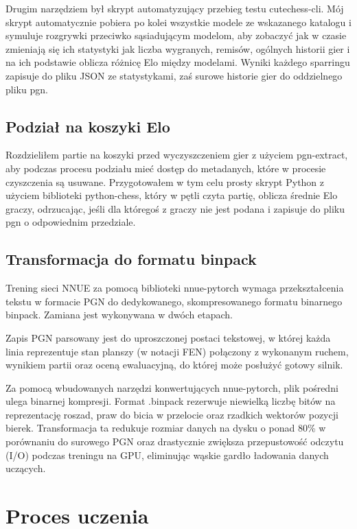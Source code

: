 \documentclass[12pt,a4paper]{report}
\begin{document}
Drugim narzędziem był skrypt automatyzujący przebieg testu cutechess-cli. Mój skrypt automatycznie pobiera po kolei wszystkie modele ze wskazanego katalogu i symuluje rozgrywki przeciwko sąsiadującym modelom, aby zobaczyć jak w czasie zmieniają się ich statystyki jak liczba wygranych, remisów, ogólnych historii gier i na ich podstawie oblicza różnicę Elo między modelami. Wyniki każdego sparringu zapisuje do pliku JSON ze statystykami, zaś surowe historie gier do oddzielnego pliku pgn.

\section{Podział na koszyki Elo}

Rozdzieliłem partie na koszyki przed wyczyszczeniem gier z użyciem pgn-extract, aby podczas procesu podziału mieć dostęp do metadanych, które w procesie czyszczenia są usuwane. Przygotowałem w tym celu prosty skrypt Python z użyciem biblioteki python-chess, który w pętli czyta partię, oblicza średnie Elo graczy, odrzucając, jeśli dla któregoś z graczy nie jest podana i zapisuje do pliku pgn o odpowiednim przedziale.

\section{Transformacja do formatu binpack}

Trening sieci NNUE za pomocą biblioteki nnue-pytorch wymaga przekształcenia tekstu w formacie PGN do dedykowanego, skompresowanego formatu binarnego binpack. Zamiana jest wykonywana w dwóch etapach.

Zapis PGN parsowany jest do uproszczonej postaci tekstowej, w której każda linia reprezentuje stan planszy (w notacji FEN) połączony z wykonanym ruchem, wynikiem partii oraz oceną ewaluacyjną, do której może posłużyć gotowy silnik.

Za pomocą wbudowanych narzędzi konwertujących nnue-pytorch, plik pośredni ulega binarnej kompresji. Format .binpack rezerwuje niewielką liczbę bitów na reprezentację roszad, praw do bicia w przelocie oraz rzadkich wektorów pozycji bierek.
Transformacja ta redukuje rozmiar danych na dysku o ponad 80\% w porównaniu do surowego PGN oraz drastycznie zwiększa przepustowość odczytu (I/O) podczas treningu na GPU, eliminując wąskie gardło ładowania danych uczących.

\chapter{Proces uczenia}
\end{document}
